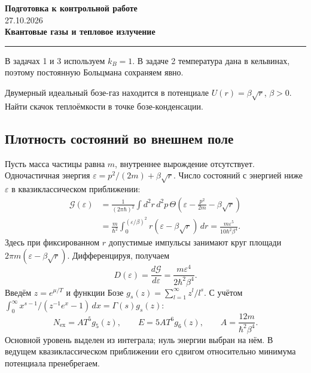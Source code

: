 \documentclass[../final.tex]{subfiles}
\begin{document}
\begin{center}
 {\Large\bfseries Подготовка к контрольной работе}\\[0.5em]
 {\small 27.10.2026}\\[0.6em]
 {\large\bfseries Квантовые газы и тепловое излучение}
\end{center}
\vspace{0.4em}\hrule\vspace{1.2em}
В задачах 1 и 3 используем $k_B=1$. В задаче 2 температура дана
в кельвинах, поэтому постоянную Больцмана сохраняем явно.

\condition
Двумерный идеальный бозе-газ находится в потенциале
$U(r)=\beta\sqrt r$, $\beta>0$. Найти скачок теплоёмкости
в точке бозе-конденсации.

\subsection*{Плотность состояний во внешнем поле}
Пусть масса частицы равна $m$, внутреннее вырождение отсутствует.
Одночастичная энергия
$\varepsilon=p^2/(2m)+\beta\sqrt r$.
Число состояний с энергией ниже $\varepsilon$ в квазиклассическом
приближении:
\begin{align*}
 \mathcal G(\varepsilon)
 &=\frac1{(2\pi\hbar)^2}
 \int d^2r\,d^2p\,
 \Theta\left(\varepsilon-\frac{p^2}{2m}-\beta\sqrt r\right)\\
 &=\frac{m}{\hbar^2}
 \int_0^{(\varepsilon/\beta)^2}r(\varepsilon-\beta\sqrt r)\,dr
 =\frac{m\varepsilon^5}{10\hbar^2\beta^4}.
\end{align*}
Здесь при фиксированном $r$ допустимые импульсы занимают круг
площади $2\pi m(\varepsilon-\beta\sqrt r)$.
Дифференцируя, получаем
\[
 D(\varepsilon)=\frac{d\mathcal G}{d\varepsilon}
 =\frac{m\varepsilon^4}{2\hbar^2\beta^4}.
\]
Введём $z=e^{\mu/T}$ и функции Бозе
$g_s(z)=\sum_{l=1}^\infty z^l/l^s$.
С учётом $\int_0^\infty x^{s-1}/(z^{-1}e^x-1)\,dx=\Gamma(s)g_s(z)$:
\[
 N_{\mathrm{ex}}=A T^5g_5(z),\qquad
 E=5A T^6g_6(z),\qquad
 A=\frac{12m}{\hbar^2\beta^4}.
\]
Основной уровень выделен из интеграла; нуль энергии выбран на нём.
В ведущем квазиклассическом приближении его сдвигом относительно
минимума потенциала пренебрегаем.
\end{document}
